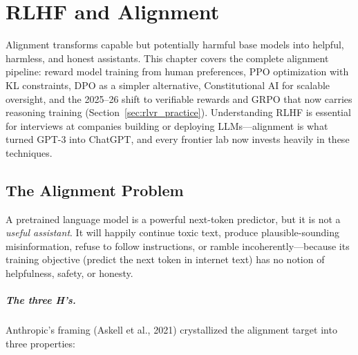 
\chapter{RLHF and Alignment}
\label{chap:rlhf_alignment}

\begin{tldr}
Alignment transforms capable but potentially harmful base models into
helpful, harmless, and honest assistants.  This chapter covers the complete
alignment pipeline: reward model training from human preferences, PPO
optimization with KL constraints, DPO as a simpler alternative,
Constitutional AI for scalable oversight, and the 2025--26 shift to
verifiable rewards and GRPO that now carries reasoning training
(Section~\ref{sec:rlvr_practice}).  Understanding RLHF is essential
for interviews at companies building or deploying LLMs---alignment is what
turned GPT-3 into ChatGPT, and every frontier lab now invests heavily in
these techniques.
\end{tldr}

\section{The Alignment Problem}
\label{sec:alignment_problem}

A pretrained language model is a powerful next-token predictor, but it is
not a \emph{useful assistant}.  It will happily continue toxic text, produce
plausible-sounding misinformation, refuse to follow instructions, or ramble
incoherently---because its training objective (predict the next token in
internet text) has no notion of helpfulness, safety, or honesty.

\paragraph{The three H's.}
Anthropic's framing (Askell et al., 2021) crystallized the alignment target
into three properties:

